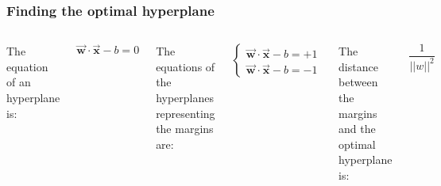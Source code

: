 \documentclass{beamer}
\begin{document}
\begin{frame}
  \frametitle{Finding the optimal hyperplane}
  \begin{columns}
      \parbox{\linewidth}{The equation of an hyperplane is:

      \begin{equation}
        \vec{\boldsymbol{w}} \cdot \vec{\boldsymbol{x}} - b = 0
      \end{equation}

      The equations of the hyperplanes representing the margins are:

      \begin{equation}
        \begin{cases}
          \vec{\boldsymbol{w}} \cdot \vec{\boldsymbol{x}} - b = +1\\
          \vec{\boldsymbol{w}} \cdot \vec{\boldsymbol{x}} - b = -1
        \end{cases}
      \end{equation}
      }

      The distance between the margins and the optimal hyperplane is:

      \begin{equation}
        \frac{1}{{\lvert \lvert w \rvert \rvert}^2}
      \end{equation}

      \centering
      \includegraphics[height=4.2cm]{img/svm-hyperplanes.png}
  \end{columns}
\end{frame}
\end{document}
